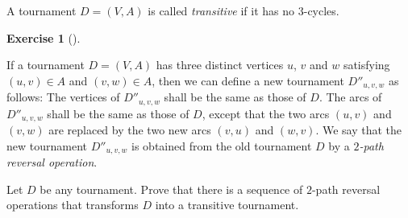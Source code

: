\documentclass[numbers=enddot,12pt,final,onecolumn,notitlepage]{scrartcl}%
\newcounter{exer}
\theoremstyle{definition}
\newtheorem{exmp}[exer]{Exercise}
\newenvironment{exercise}[1][]
{\begin{exmp}[#1]\begin{leftbar}}
{\end{leftbar}\end{exmp}}
\newcommand{\tup}[1]{\left( #1 \right)}
\begin{document}
A tournament $D = \tup{V, A}$ is called \textit{transitive} if it
has no $3$-cycles.

\begin{exercise} \label{exe.tourn.2-path-rev}
If a tournament $D = \tup{V, A}$ has three distinct vertices
$u$, $v$ and $w$ satisfying $\tup{u, v} \in A$ and $\tup{v, w} \in A$,
then we can define a new tournament $D''_{u, v, w}$ as follows:
The vertices of $D''_{u, v, w}$ shall be the same as those of $D$. The
arcs of $D''_{u, v, w}$ shall be the same as those of $D$, except that
the two arcs $\tup{u, v}$ and $\tup{v, w}$ are replaced
by the two new arcs $\tup{v, u}$ and $\tup{w, v}$.
We say that the new tournament $D''_{u, v, w}$ is obtained
from the old tournament $D$ by a \textit{$2$-path reversal operation}.

Let $D$ be any tournament. Prove that there is a sequence of
$2$-path reversal operations that transforms $D$ into a transitive
tournament.
\end{exercise}
\end{document}
